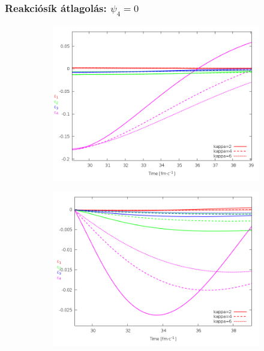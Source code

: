\documentclass{beamer}
\begin{document}
\begin{frame}
\frametitle{Reakciósík átlagolás: $\psi_4=0$}
\begin{center}
\begin{itemize}
\setlength{\itemsep}{12pt}

\end{itemize}
\begin{figure}[H]
	\centering
    \begin{subfigure}[b]{0.49\textwidth}
    		\includegraphics[width=\textwidth]{pic/summer/avg_Psi4_p}
	\end{subfigure}
	\begin{subfigure}[b]{0.49\textwidth}
        	\includegraphics[width=\textwidth]{pic/summer/avg_Psi4_v}
	\end{subfigure}
\end{figure}
\end{center}
\end{frame}
\end{document}
